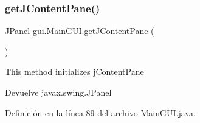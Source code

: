 \mbox{\label{classgui_1_1MainGUI_ae3ce89a59dcf27273ec658ee42cd61b8}} 
\subsubsection{\texorpdfstring{getJContentPane()}{getJContentPane()}}
{\footnotesize\ttfamily J\+Panel gui.\+Main\+G\+U\+I.\+get\+J\+Content\+Pane (\begin{DoxyParamCaption}{ }\end{DoxyParamCaption})\hspace{0.3cm}{\ttfamily [private]}}

This method initializes j\+Content\+Pane

\begin{DoxyReturn}{Devuelve}
javax.\+swing.\+J\+Panel 
\end{DoxyReturn}


Definición en la línea 89 del archivo Main\+G\+U\+I.\+java.


